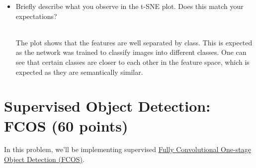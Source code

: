 \documentclass[11pt,addpoints,answers]{exam}
\numberwithin{equation}{section} %
\numberwithin{figure}{section} %
\numberwithin{table}{section} %
\begin{document}
\begin{itemize}
\begin{itemize}
        \item Briefly describe what you observe in the t-SNE plot. Does this match your expectations?

        \begin{solution}
        \\ The plot shows that the features are well separated by class. This is expected as the network was trained to classify images into different classes.
        One can see that certain classes are closer to each other in the feature space, which is expected as they are semantically similar.
        \end{solution}
        
    \end{itemize}
\end{itemize}

\clearpage
\section{Supervised Object Detection: FCOS (60 points)}
In this problem, we'll be implementing supervised {\href{https://arxiv.org/abs/1904.01355}{Fully Convolutional One-stage Object Detection (FCOS)}}. 
\end{document}
